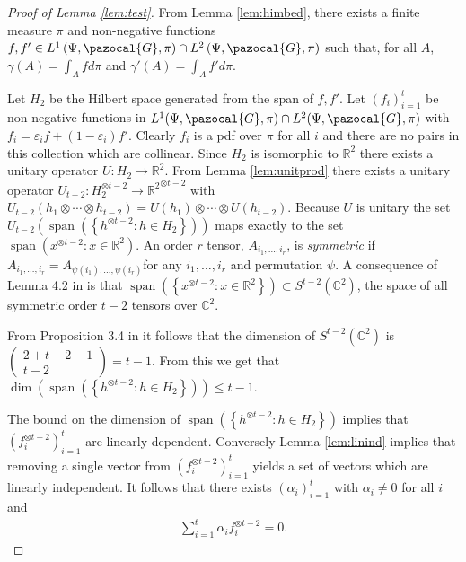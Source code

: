 \documentclass[aos]{imsart}
\def\rn{\mathbb{R}}
\def\cn{\mathbb{C}}
\def\l{\left}
\def\r{\right}
\def\sG{\pazocal{G}}
\def\span{\operatorname{span}}
\def\span{\operatorname{span}}
\theoremstyle{plain}
\theoremstyle{defintion}
\begin{document}
	\begin{proof}[Proof of Lemma \ref{lem:test}]
		From Lemma \ref{lem:himbed}, there exists a finite measure $\pi$ and non-negative functions $f,f' \in L^1\left( \Psi,\sG,\pi \right)\cap L^2\left( \Psi,\sG,\pi \right)$ such that, for all $A$, $\gamma\left( A \right) = \int_A f d\pi$ and $\gamma'\left( A \right) = \int_A f' d\pi$.

		Let $H_2$ be the Hilbert space generated from the span of $f,f'$. Let $\left( f_i \right)_{i=1}^{t}$ be non-negative functions in $L^1(\Psi, \sG, \pi)\cap L^2(\Psi, \sG, \pi)$ with $f_i = \varepsilon_i f + \left( 1-\varepsilon_i \right)f'$. Clearly $f_i$ is a pdf over $\pi$ for all $i$ and there are no pairs in this collection which are collinear. Since $H_2$ is isomorphic to $\rn^2$ there exists a unitary operator $U:H_2 \to \rn^2$. From Lemma \ref{lem:unitprod} there exists a unitary operator $U_{t-2}:H_2^{\otimes t-2} \to {\rn^2}^{\otimes t-2}$ with $U_{t-2}\left( h_1 \otimes\cdots \otimes h_{t-2} \right) = U(h_1) \otimes \cdots \otimes U(h_{t-2})$. Because $U$ is unitary the set $U_{t-2}\left( \span\left( \left\{ h^{\otimes t-2}: h \in H_2 \right\} \right) \right)$ maps exactly to the set $\span\left( x^{\otimes t-2}:x \in \rn^2 \right)$.  An order $r$ tensor, $A_{i_1,\ldots,i_r}$, is {\it symmetric} if $A_{i_1,\ldots,i_r} = A_{\psi\left( i_1 \right),\ldots,\psi\left( i_r \right)}$for any $i_1,\ldots, i_r$ and permutation $\psi$. A consequence of Lemma 4.2 in \cite{symtensorrank} is that $\span\left( \l\{x^{\otimes t-2}:x \in \rn^2\r\} \right)\subset S^{ t-2}(\cn^2)$, the space of all symmetric order $t-2$ tensors over $\cn^2$.

 From Proposition 3.4 in \cite{symtensorrank} it follows that the dimension of $S^{ t-2 }\left( \cn^2 \right)$ is $\left( \begin{array}{c} 2+ t-2-1 \\ t-2 \end{array} \right) = t-1$. From this we get that $\dim\left( \span\left( \left\{ h^{\otimes t-2}: h \in H_2 \right\} \right)\right)\le t-1$.

		The bound on the dimension of $\span\left( \left\{ h^{\otimes t-2}: h \in H_2 \right\} \right)$ implies that $\left( f_i^{\otimes t-2} \right)_{i=1}^{t}$ are linearly dependent. Conversely Lemma \ref{lem:linind} implies that removing a single vector from $\left( f_i^{\otimes t-2} \right)_{i=1}^{t}$ yields a set of vectors which are linearly independent. It follows that there exists $\left( \alpha_i \right)_{i=1}^{t}$ with $\alpha_i \neq 0$ for all $i$ and
		\begin{eqnarray*}
			\sum_{i=1}^{t}\alpha_i f_i^{\otimes t-2} = 0.
		\end{eqnarray*}


\end{proof}
\end{document}
